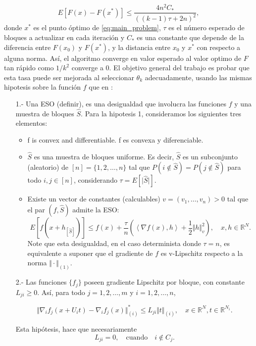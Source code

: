 \documentclass{article}
\newcommand{\R}{\mathbb{R}}
\newcommand{\x}{x^*}
\begin{document}
\begin{equation}
	\label{eq:FR_complexity}
	E\left[ F(x) - F(\x) \right] \leq \frac{4n^2C_*}{\left( (k-1)\tau + 2n \right)^2},
\end{equation}
donde $\x$ es el punto óptimo de  \eqref{eq:main_problem}, $\tau$ es el número esperado de bloques a actualizar en cada iteración y $C_*$ es una constante que depende de la diferencia entre  $F(x_0)$ y $F(\x)$, y la distancia entre $x_0$ y $\x$  con respecto a alguna norma. Así, el algoritmo converge en valor esperado al valor optimo de $F$ tan rápido como $1/k^2$ converge a 0. El objetivo general del trabajo es probar que esta tasa puede ser mejorada al seleccionar $\theta_k$ adecuadamente, usando las mismas hipotesis sobre la función $f$ que en \cite{Fercoq_Richtarik}:

\begin{itemize} 
	\item[1.-] Una ESO (definir), es una desigualdad que involucra las funciones  $f$ y una muestra de bloques  $\hat{S}$. Para la hipotesis 1, consideramos los siguientes tres elementos:
	\begin{itemize}
		\item f is convex and differentiable. f es convexa y diferenciable.
		\item $\hat{S}$ es una muestra de bloques uniforme. Es decir, $\hat{S}$ es un subconjunto (aleatorio) de $[n] = \lbrace 1,2,\ldots,n \rbrace$ tal que $P(i \notin \hat{S}) = P(j \notin \hat{S})$ para todo $i,j \in [n]$, considerando $\tau = E[\vert \hat{S} \vert]$.
		\item Existe un vector de constantes (calculables) $v=\left(  v_1,\ldots,v_n \right) > 0$ tal que el par $(f,\hat{S})$ admite la  ESO:
		\begin{equation}
			E\left[ f\left(x + h_{[\hat{S}]} \right)  \right] \leq f(x) + \frac{\tau}{n} \left( \left< \nabla f(x),h \right> + \frac{1}{2}\Vert h \Vert_v^2 \right), \quad x,h \in \R^N.	
		\end{equation}		 
Note que esta desigualdad, en el caso determinista donde $\tau = n$, es equivalente a suponer que el gradiente de $f$ es v-Lipschitz  respecto a la norma  $\Vert \cdot \Vert_{(1)}$.	
	\end{itemize}	
	
	
	\item[2.-]Las funciones  $\lbrace f_j \rbrace$ poseen gradiente Lipschitz por bloque, con constante $L_{ji} \geq 0$. Así, para todo $j=1,2,\ldots,m$ y $i=1,2,\ldots,n$,

\begin{equation}
 \Vert \nabla_i f_j(x+U_it)-\nabla_i f_j(x) \Vert_{(i)}^* \leq L_{ji}\Vert t\Vert_{(i)}, \quad x \in \R^N,t\in \R^{N_i}.
\end{equation}

Esta hipótesis, hace que necesariamente
\begin{equation}
	L_{ji} = 0, \quad \text{cuando} \quad i \notin C_j.
\end{equation}
\end{itemize}
\end{document}

